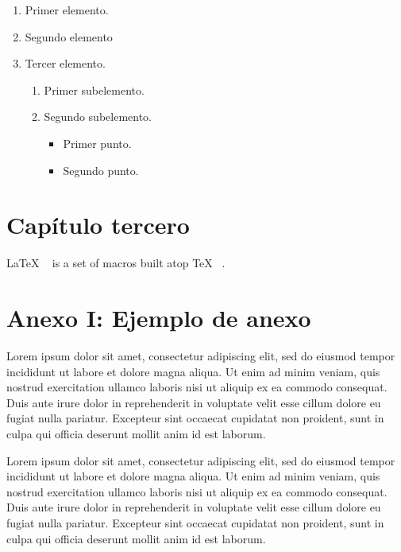 \documentclass[12pt,a4paper]{report}
\newcommand{\headlinecolor}{\color{slcolor}}
\begin{document}
\begin{enumerate}[label=\bfseries\headlinecolor\arabic*.]
\item Primer elemento.
\item Segundo elemento
\item Tercer elemento.
\begin{enumerate}[label=\alph*)]
\item Primer subelemento.
\item Segundo subelemento.
\begin{itemize}[label=$\bullet$]
\item Primer punto.
\item Segundo punto.
\end{itemize}

\end{enumerate}

\end{enumerate}


\chapter{Capítulo tercero}\label{cap:cap3}



\LaTeX{} ~\cite{latex2e} is a set of macros built atop \TeX{} ~\cite{texbook}.

\appendix
\chapter{Anexo I: Ejemplo de anexo}\label{cap:anexo1}
Lorem ipsum dolor sit amet, consectetur adipiscing elit, sed do eiusmod tempor incididunt ut labore et dolore magna aliqua. Ut enim ad minim veniam, quis nostrud exercitation ullamco laboris nisi ut aliquip ex ea commodo consequat. Duis aute irure dolor in reprehenderit in voluptate velit esse cillum dolore eu fugiat nulla pariatur. Excepteur sint occaecat cupidatat non proident, sunt in culpa qui officia deserunt mollit anim id est laborum.

Lorem ipsum dolor sit amet, consectetur adipiscing elit, sed do eiusmod tempor incididunt ut labore et dolore magna aliqua. Ut enim ad minim veniam, quis nostrud exercitation ullamco laboris nisi ut aliquip ex ea commodo consequat. Duis aute irure dolor in reprehenderit in voluptate velit esse cillum dolore eu fugiat nulla pariatur. Excepteur sint occaecat cupidatat non proident, sunt in culpa qui officia deserunt mollit anim id est laborum.
\end{document}
